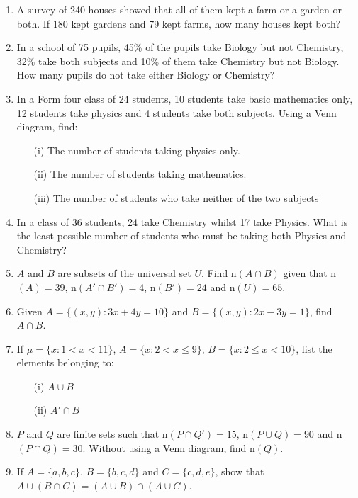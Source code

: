 \begin{enumerate}
	\item A survey of 240 houses showed that all of them kept a farm or a garden or both. If 180 kept gardens and 79 kept farms, how many houses kept both?
	
	\item In a school of 75 pupils, 45\% of the pupils take Biology but not Chemistry, 32\% take both subjects and 10\% of them take Chemistry but not Biology. How many pupils do not take either Biology or Chemistry?
	
	\item In a Form four class of 24 students, 10 students take basic mathematics only, 12 students take physics and 4 students take both subjects. Using a Venn diagram, find:
	\begin{itemize}
	\item[(i)] The number of students taking physics only.
	\item[(ii)] The number of students taking mathematics.
	\item[(iii)] The number of students who take neither of the two subjects
	\end{itemize}
	
	\item In a class of 36 students, 24 take Chemistry whilst 17 take Physics. What is the least possible number of students who must be taking both Physics and Chemistry?
	
	
	\item $A$ and $B$ are subsets of the universal set $U$. Find n$(A \cap B)$ given that n$(A) = 39$, n$(A' \cap B') = 4$, n$(B') = 24$ and n$(U) = 65$.

	\item Given $A = \{(x,y):3x + 4y = 10\}$ and $B = \{(x,y):2x - 3y = 1\}$, find $A \cap B$.
	
	\item If $\mu = \{x:1 < x < 11\}$, $A = \{x:2 < x \leq 9\}$, $B = \{x:2 \leq x < 10\}$, list the elements belonging to:
	\begin{itemize}
	\item[(i)] $A \cup B$
	\item[(ii)] $A' \cap B$
	\end{itemize}
	
	\item $P$ and $Q$ are finite sets such that n$(P \cap Q') = 15$, n$(P \cup Q) = 90$ and n$(P \cap Q) = 30$. Without using a Venn diagram, find n$(Q)$.
	
	\item If $A = \{a, b, c\}$, $B = \{b, c, d\}$ and $C = \{c, d, e\}$, show that $A \cup (B \cap C) = (A \cup B) \cap (A \cup C)$.
	

\end{enumerate}
